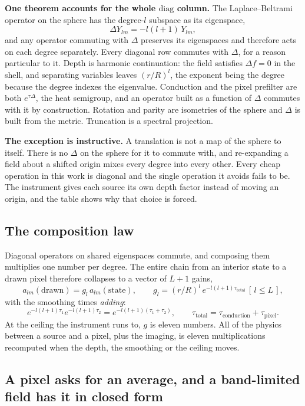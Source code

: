 \textbf{One theorem accounts for the whole \(\mathrm{diag}\) column.} The Laplace--Beltrami operator on the sphere has the degree-\(l\) subspace as its eigenspace,
\[
  \Delta Y_{lm} = -l(l+1)\, Y_{lm},
\]
and any operator commuting with \(\Delta\) preserves its eigenspaces and therefore acts on each degree separately. Every diagonal row commutes with \(\Delta\), for a reason particular to it. Depth is harmonic continuation: the field satisfies \(\Delta f = 0\) in the shell, and separating variables leaves \((r/R)^l\), the exponent being the degree because the degree indexes the eigenvalue. Conduction and the pixel prefilter are both \(e^{\tau\Delta}\), the heat semigroup, and an operator built as a function of \(\Delta\) commutes with it by construction. Rotation and parity are isometries of the sphere and \(\Delta\) is built from the metric. Truncation is a spectral projection.

\textbf{The exception is instructive.} A translation is not a map of the sphere to itself. There is no \(\Delta\) on the sphere for it to commute with, and re-expanding a field about a shifted origin mixes every degree into every other. Every cheap operation in this work is diagonal and the single operation it avoids fails to be. The instrument gives each source its own depth factor instead of moving an origin, and the table shows why that choice is forced.

\subsection{The composition law}

Diagonal operators on shared eigenspaces commute, and composing them multiplies one number per degree. The entire chain from an interior state to a drawn pixel therefore collapses to a vector of \(L+1\) gains,
\[
  a_{lm}(\text{drawn}) = g_l \, a_{lm}(\text{state}),
  \qquad
  g_l = (r/R)^{l}\, e^{-l(l+1)\tau_{\mathrm{total}}}\, [\,l \le L\,],
\]
with the smoothing times \emph{adding}:
\[
  e^{-l(l+1)\tau_1} e^{-l(l+1)\tau_2} = e^{-l(l+1)(\tau_1 + \tau_2)},
  \qquad
  \tau_{\mathrm{total}} = \tau_{\mathrm{conduction}} + \tau_{\mathrm{pixel}}.
\]
At the ceiling the instrument runs to, \(g\) is eleven numbers. All of the physics between a source and a pixel, plus the imaging, is eleven multiplications recomputed when the depth, the smoothing or the ceiling moves.

\subsection{A pixel asks for an average, and a band-limited field has it in closed form}

